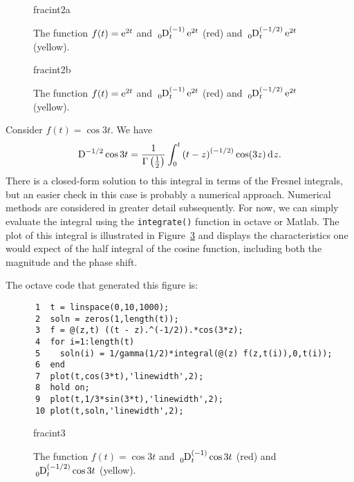     \begin{figure}
      \centering
      {fracint2a}
      \caption{The function $f(t) = \operatorname{e}^{2 t}$ and $\tensor*[_0]{\D}{^{(-1)}_t} \e^{2t}$ (red) and $\tensor*[_0]{\D}{^{(-1/2)}_t} \e^{2t}$ (yellow).}
      \label{fig:fracint2a}
    \end{figure}

    \begin{figure}
      \centering
      {fracint2b}
      \caption{The function $f(t) = \operatorname{e}^{2 t}$ and $\tensor*[_0]{\D}{^{(-1)}_t} \e^{2t}$ (red) and $\tensor*[_0]{\D}{^{(-1/2)}_t} \e^{2t}$ (yellow).}
      \label{fig:fracint2b}
    \end{figure}

    \begin{example}
      Consider $f(t) = \cos 3 t$. We have
      \begin{equation*}
	\tensor*[]{\D}{^{-1/2}} \cos 3 t = \frac{1}{\Gamma \left( \frac{1}{2} \right) } \int_0^t \left( t - z \right)^{\left( -1/2 \right)} \cos(3z) \d{z}.
      \end{equation*}
      There is a closed-form solution to this integral in terms of the Fresnel integrals, but an easier check in this case
      is probably a numerical approach. Numerical methods are considered in greater detail subsequently. For now, we can
      simply evaluate the integral using the \texttt{integrate()} function in octave or Matlab. The plot of this integral is
      illustrated in Figure~\ref{fig:fracint3} and displays the characteristics one would expect of the half integral of
      the cosine function, including both the magnitude and the phase shift.  

      The octave code that generated this figure is:
      \begin{verbatim}
      1  t = linspace(0,10,1000);
      2  soln = zeros(1,length(t));
      3  f = @(z,t) ((t - z).^(-1/2)).*cos(3*z);
      4  for i=1:length(t)
      5    soln(i) = 1/gamma(1/2)*integral(@(z) f(z,t(i)),0,t(i));
      6  end
      7  plot(t,cos(3*t),'linewidth',2);
      8  hold on;
      9  plot(t,1/3*sin(3*t),'linewidth',2);
      10 plot(t,soln,'linewidth',2);
      \end{verbatim}
    \end{example}

    \begin{figure}
      \centering
      {fracint3}
      \caption{The function $f(t) = \cos 3 t$ and $\tensor*[_0]{\D}{^{(-1)}_t} \cos 3 t$ (red) and $\tensor*[_0]{\D}{^{(-1/2)}_t} \cos 3t$ (yellow).}
      \label{fig:fracint3}
    \end{figure}

